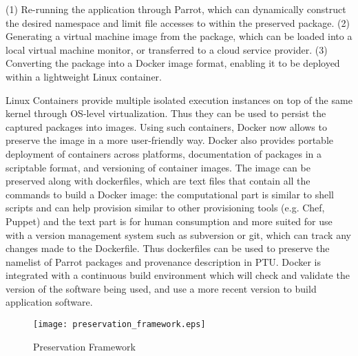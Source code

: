 (1) Re-running the application through Parrot, which can dynamically construct
the desired namespace and limit file accesses to within the preserved package.
(2) Generating a virtual machine image from the package, which can be loaded
into a local virtual machine monitor, or transferred to a cloud service provider.
(3) Converting the package into a Docker image format, enabling it to be
deployed within a lightweight Linux container.

\vspace{5pt}
 Linux Containers provide multiple isolated execution instances on top of the same kernel through OS-level virtualization. Thus they can be used to persist the captured packages into images. 
Using such containers, Docker now allows to preserve the image in a more user-friendly way. 
Docker also provides portable deployment of containers across platforms, documentation of packages in a scriptable format, and versioning of container images. The image can be preserved along with dockerfiles, which are text files that contain all the commands to build a Docker image: the computational part is similar to shell scripts and can help provision similar to other provisioning tools (e.g. Chef, Puppet) and the text part is for human consumption and more suited for use with a version management system such as subversion or git, which can track any changes made to the Dockerfile. Thus dockerfiles can be used to preserve the namelist of Parrot packages and provenance description in PTU. 
Docker is integrated with a continuous build environment which will check and validate the version of the software being used, and use a more recent version to build application software. 

\begin{figure*}
\centering
\texttt{[image: preservation\_framework.eps]}
\caption{Preservation Framework}
\label{fig: preservation_framework}
\end{figure*}

